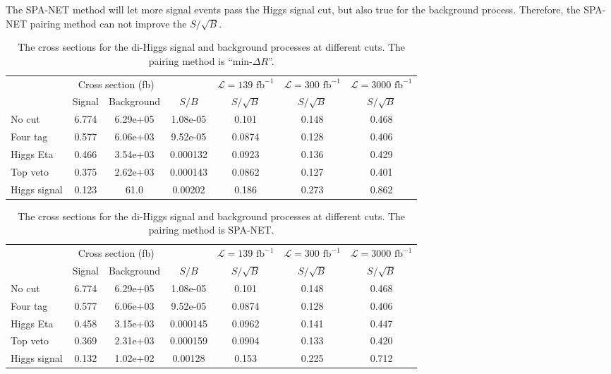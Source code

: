 \documentclass[12pt]{article}
\begin{document}
		The SPA-NET method will let more signal events pass the Higgs signal cut, but also true for the background process. Therefore, the SPA-NET pairing method can not improve the $S/\sqrt{B}$.
		\begin{table}[htpb]
			\centering
			\caption{The cross sections for the di-Higgs signal and background processes at different cuts. The pairing method is ``$\text{min-}\Delta R$''.}
			\label{tab:diHiggs_signal_background_analysis_ATLAS_mindR}
			\begin{tabular}{l|cc|c|c|c|c}
							 & \multicolumn{2}{c|}{Cross section (fb)} &          & $\mathcal{L} = 139 \text{ fb}^{-1}$ & $\mathcal{L} = 300 \text{ fb}^{-1}$ & $\mathcal{L} = 3000 \text{ fb}^{-1}$ \\
							 & Signal           & Background           & $S / B$  & $S/\sqrt{B}$                        & $S/\sqrt{B}$                        & $S/\sqrt{B}$                         \\ \hline
				No cut       & 6.774 & 6.29e+05 & 1.08e-05 & 0.101  & 0.148 & 0.468 \\
				Four tag     & 0.577 & 6.06e+03 & 9.52e-05 & 0.0874 & 0.128 & 0.406 \\
				Higgs Eta    & 0.466 & 3.54e+03 & 0.000132 & 0.0923 & 0.136 & 0.429 \\
				Top veto     & 0.375 & 2.62e+03 & 0.000143 & 0.0862 & 0.127 & 0.401 \\
				Higgs signal & 0.123 & 61.0     & 0.00202  & 0.186  & 0.273 & 0.862
			\end{tabular}	
		\end{table}

		\begin{table}[htpb]
			\centering
			\caption{The cross sections for the di-Higgs signal and background processes at different cuts. The pairing method is SPA-NET.}
			\label{tab:diHiggs_signal_background_analysis_ATLAS_SPANet}
			\begin{tabular}{l|cc|c|c|c|c}
							 & \multicolumn{2}{c|}{Cross section (fb)} &          & $\mathcal{L} = 139 \text{ fb}^{-1}$ & $\mathcal{L} = 300 \text{ fb}^{-1}$ & $\mathcal{L} = 3000 \text{ fb}^{-1}$ \\
							 & Signal           & Background           & $S / B$  & $S/\sqrt{B}$                        & $S/\sqrt{B}$                        & $S/\sqrt{B}$                         \\ \hline
				No cut       & 6.774 & 6.29e+05 & 1.08e-05 & 0.101  & 0.148 & 0.468 \\
				Four tag     & 0.577 & 6.06e+03 & 9.52e-05 & 0.0874 & 0.128 & 0.406 \\
				Higgs Eta    & 0.458 & 3.15e+03 & 0.000145 & 0.0962 & 0.141 & 0.447 \\
				Top veto     & 0.369 & 2.31e+03 & 0.000159 & 0.0904 & 0.133 & 0.420 \\
				Higgs signal & 0.132 & 1.02e+02 & 0.00128  & 0.153  & 0.225 & 0.712			
			\end{tabular}
		\end{table}
\end{document}
